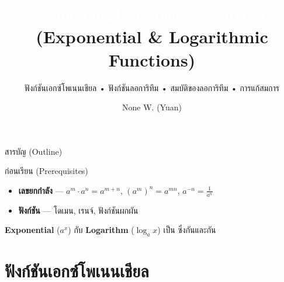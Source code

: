 \documentclass[11pt, aspectratio=169]{beamer}
\title[เอกซ์โพเนนเชียลและลอการิทึม]{\textcolor{white}{ฟังก์ชันเอกซ์โพเนนเชียลและลอการิทึม} \\ \textcolor{boxBlue!60}{(Exponential \& Logarithmic Functions)}}
\subtitle{ฟังก์ชันเอกซ์โพเนนเชียล • ฟังก์ชันลอการิทึม • สมบัติของลอการิทึม • การแก้สมการ }
\author[None W. (Yuan)]{None W. (Yuan)}
\date{}
\begin{document}
\begin{frame}[plain]\titlepage\end{frame}
\begin{frame}{สารบัญ (Outline)}\tableofcontents\end{frame}

\begin{frame}{ก่อนเรียน (Prerequisites)}
  \begin{explanation}
    \begin{itemize}
      \item \textbf{เลขยกกำลัง} — $a^m \cdot a^n = a^{m+n}$, $(a^m)^n = a^{mn}$, $a^{-n} = \frac{1}{a^n}$
      \item \textbf{ฟังก์ชัน} — โดเมน, เรนจ์, ฟังก์ชันผกผัน
    \end{itemize}
  \end{explanation}

  \begin{intuition}
    \textbf{Exponential} ($a^x$) กับ \textbf{Logarithm} ($\log_a x$) เป็น ซึ่งกันและกัน
  \end{intuition}
\end{frame}

\section{ฟังก์ชันเอกซ์โพเนนเชียล}
\end{document}
